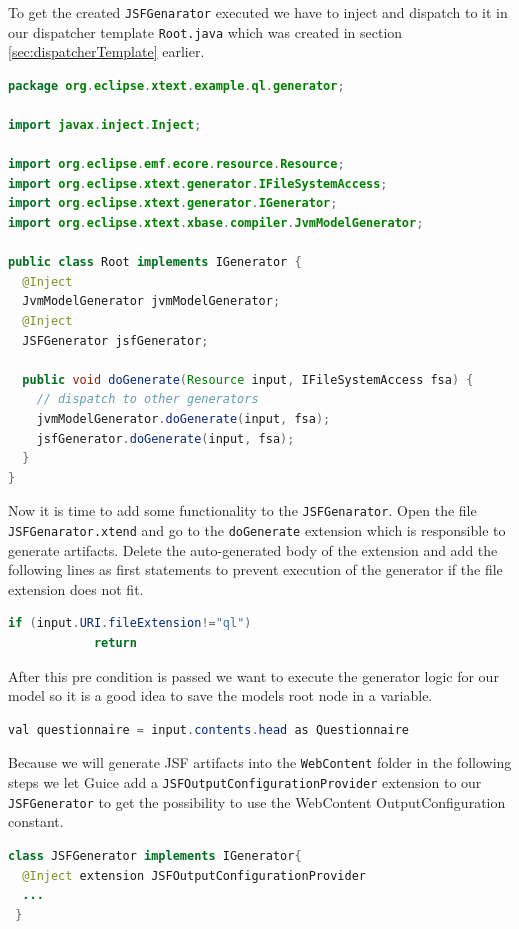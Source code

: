 To get the created \texttt{JSFGenarator} executed we have to inject and dispatch
to it in our dispatcher template \texttt{Root.java}
which was created in section \ref{sec:dispatcherTemplate}
earlier.

\begin{lstlisting}[language=Java] 
 package org.eclipse.xtext.example.ql.generator;

import javax.inject.Inject;

import org.eclipse.emf.ecore.resource.Resource;
import org.eclipse.xtext.generator.IFileSystemAccess;
import org.eclipse.xtext.generator.IGenerator;
import org.eclipse.xtext.xbase.compiler.JvmModelGenerator;

public class Root implements IGenerator {
  @Inject
  JvmModelGenerator jvmModelGenerator;
  @Inject
  JSFGenerator jsfGenerator;

  public void doGenerate(Resource input, IFileSystemAccess fsa) {
    // dispatch to other generators
    jvmModelGenerator.doGenerate(input, fsa);
    jsfGenerator.doGenerate(input, fsa);
  } 
}
\end{lstlisting}

Now it is time to add some functionality to the \texttt{JSFGenarator}. Open the
file \texttt{JSFGenarator.xtend} and go to the \texttt{doGenerate} extension
which is responsible to generate artifacts.
Delete the auto-generated body of the extension and add the following lines as
first statements to prevent execution of the generator if the file extension
does not fit.

\begin{lstlisting}[language=Java] 
  if (input.URI.fileExtension!="ql")
            return
\end{lstlisting}

After this pre condition is passed we want to execute the generator logic for
our model so it is a good idea to save the models root node in a variable.

\begin{lstlisting}[language=Java] 
  val questionnaire = input.contents.head as Questionnaire 
\end{lstlisting}

Because we will generate JSF artifacts into the \texttt{WebContent} folder in
the following steps we let Guice add a \texttt{JSFOutputConfigurationProvider}
extension to our \texttt{JSFGenerator} to get the possibility to use the
WebContent OutputConfiguration constant.

\begin{lstlisting}[language=Java] 
class JSFGenerator implements IGenerator{
  @Inject extension JSFOutputConfigurationProvider
  ...
 }
\end{lstlisting}

